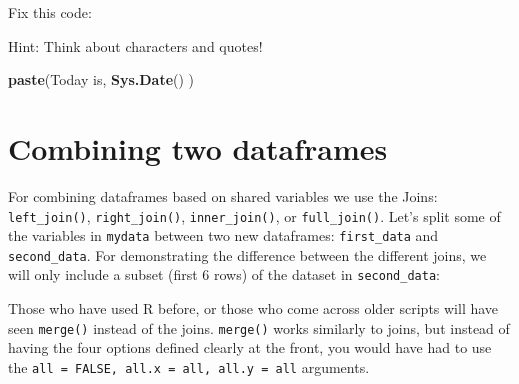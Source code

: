 \documentclass[]{book}
\makeatletter
\newenvironment{Shaded}{\begin{snugshade}}{\end{snugshade}}
\newcommand{\KeywordTok}[1]{\textcolor[rgb]{0.13,0.29,0.53}{\textbf{#1}}}
\newcommand{\DecValTok}[1]{\textcolor[rgb]{0.00,0.00,0.81}{#1}}
\newcommand{\StringTok}[1]{\textcolor[rgb]{0.31,0.60,0.02}{#1}}
\newcommand{\CommentTok}[1]{\textcolor[rgb]{0.56,0.35,0.01}{\textit{#1}}}
\newcommand{\OperatorTok}[1]{\textcolor[rgb]{0.81,0.36,0.00}{\textbf{#1}}}
\newcommand{\NormalTok}[1]{#1}
\newenvironment{kframe}{%
\medskip{}
\setlength{\fboxsep}{.8em}
 \def\at@end@of@kframe{}%
 \ifinner\ifhmode%
  \def\at@end@of@kframe{\end{minipage}}%
  \begin{minipage}{\columnwidth}%
 \fi\fi%
 \def\FrameCommand##1{\hskip\@totalleftmargin \hskip-\fboxsep
 \colorbox{shadecolor}{##1}\hskip-\fboxsep
     \hskip-\linewidth \hskip-\@totalleftmargin \hskip\columnwidth}%
 \MakeFramed {\advance\hsize-\width
   \@totalleftmargin\z@ \linewidth\hsize
   \@setminipage}}%
 {\par\unskip\endMakeFramed%
 \at@end@of@kframe}
\renewenvironment{Shaded}{\begin{kframe}}{\end{kframe}}
\makeatother
\begin{document}
Fix this code:

Hint: Think about characters and quotes!

\begin{Shaded}
\begin{Highlighting}[]
\KeywordTok{paste}\NormalTok{(Today is, }\KeywordTok{Sys.Date}\NormalTok{() )}
\end{Highlighting}
\end{Shaded}

\section{Combining two dataframes}\label{combining-two-dataframes}

For combining dataframes based on shared variables we use the Joins:
\texttt{left\_join()}, \texttt{right\_join()}, \texttt{inner\_join()},
or \texttt{full\_join()}. Let's split some of the variables in
\texttt{mydata} between two new dataframes: \texttt{first\_data} and
\texttt{second\_data}. For demonstrating the difference between the
different joins, we will only include a subset (first 6 rows) of the
dataset in \texttt{second\_data}:

\begin{Shaded}
\end{Shaded}

Those who have used R before, or those who come across older scripts
will have seen \texttt{merge()} instead of the joins. \texttt{merge()}
works similarly to joins, but instead of having the four options defined
clearly at the front, you would have had to use the
\texttt{all\ =\ FALSE,\ all.x\ =\ all,\ all.y\ =\ all} arguments.
\end{document}
